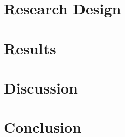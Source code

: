 \documentclass[english, grading]{tktltiki2}
\theoremstyle{definition}
\theoremstyle{remark}
\numberwithin{equation}{section} %
\begin{document}
\section{Research Design}


\section{Results}


\section{Discussion}



\section{Conclusion}
































%

%
%
%
%
\newpage






\newpage
\appendix
% 


\end{document}
